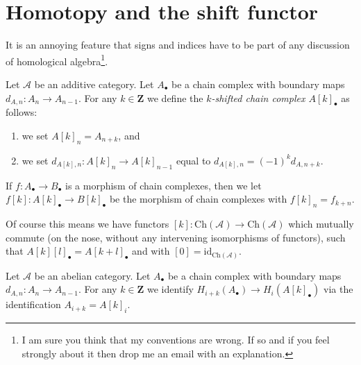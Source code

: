

















\section{Homotopy and the shift functor}
\label{section-homotopy-shift}

\noindent
It is an annoying feature that signs and indices
have to be part of any discussion of homological
algebra\footnote{I am sure you think that my conventions
are wrong. If so and if you feel strongly about it
then drop me an email with an explanation.}.

\begin{definition}
\label{definition-shift}
Let $\mathcal{A}$ be an additive category.
Let $A_\bullet$ be a chain complex
with boundary maps $d_{A, n} : A_n \to A_{n - 1}$.
For any $k \in \mathbf{Z}$ we define the
{\it $k$-shifted chain complex $A[k]_\bullet$}
as follows:
\begin{enumerate}
\item we set $A[k]_n = A_{n + k}$, and
\item we set $d_{A[k], n} : A[k]_n \to A[k]_{n - 1}$
equal to $d_{A[k], n} = (-1)^k d_{A, n + k}$.
\end{enumerate}
If $f : A_\bullet \to B_\bullet$ is a morphism of
chain complexes, then we let
$f[k] : A[k]_\bullet \to B[k]_\bullet$ be the
morphism of chain complexes with
$f[k]_n = f_{k + n}$.
\end{definition}

\noindent
Of course this means we have functors
$[k] : \text{Ch}(\mathcal{A}) \to \text{Ch}(\mathcal{A})$
which mutually commute (on the nose, without
any intervening isomorphisms of functors),
such that $A[k][l]_\bullet = A[k + l]_\bullet$ and
with $[0] = \text{id}_{\text{Ch}(\mathcal{A})}$.

\begin{definition}
\label{definition-homology-shift}
Let $\mathcal{A}$ be an abelian category.
Let $A_\bullet$ be a chain complex
with boundary maps $d_{A, n} : A_n \to A_{n - 1}$.
For any $k \in \mathbf{Z}$ we identify
{\it $H_{i + k}(A_\bullet) \rightarrow H_i(A[k]_\bullet)$}
via the identification
$A_{i + k} = A[k]_i$.
\end{definition}

